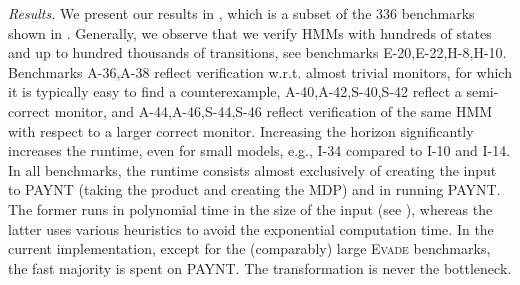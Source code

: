 \documentclass[runningheads]{llncs}
\renewcommand{\paragraph}[1]{\smallskip\noindent\emph{#1}}
\begin{document}
\paragraph{Results.}
We present our results in , which is a subset of the 336 benchmarks shown in . Generally, we observe that we verify HMMs with hundreds of states and up to hundred thousands of transitions, see benchmarks \textsc{E-20},\textsc{E-22},\textsc{H-8},\textsc{H-10}.
Benchmarks \textsc{A-36},\textsc{A-38} reflect verification w.r.t. almost trivial monitors, for which it is typically easy to find a counterexample, \textsc{A-40},\textsc{A-42},\textsc{S-40},\textsc{S-42} reflect a semi-correct monitor, and \textsc{A-44},\textsc{A-46},\textsc{S-44},\textsc{S-46} reflect verification of the same HMM with respect to a larger correct monitor.
Increasing the horizon significantly increases the runtime, even for small models, e.g., \textsc{I-34} compared to \textsc{I-10} and \textsc{I-14}.
In all benchmarks, the runtime consists almost exclusively of creating the input to PAYNT (taking the product and creating the MDP) and in running PAYNT. The former runs in polynomial time in the size of the input (see ), whereas the latter uses various heuristics to avoid the exponential computation time. In the current implementation, except for the (comparably) large \textsc{Evade} benchmarks, the fast majority is spent on PAYNT. The transformation is never the bottleneck.

\end{document}
